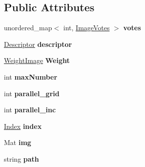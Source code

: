 \subsection*{\-Public \-Attributes}
\begin{DoxyCompactItemize}
\item 
\hypertarget{classMatchingImage_acffbf75099f1a39f35bb2296301828c8}{unordered\-\_\-map$<$ int, \hyperlink{classImageVotes}{\-Image\-Votes} $>$ {\bfseries votes}}\label{classMatchingImage_acffbf75099f1a39f35bb2296301828c8}

\item 
\hypertarget{classMatchingImage_a95e570f95473d1879d0bc67966dd5a6b}{\hyperlink{classDescriptor}{\-Descriptor} {\bfseries descriptor}}\label{classMatchingImage_a95e570f95473d1879d0bc67966dd5a6b}

\item 
\hypertarget{classMatchingImage_a2b29bfff30c24d43f3ffb674a1ee3911}{\hyperlink{classWeightImage}{\-Weight\-Image} {\bfseries \-Weight}}\label{classMatchingImage_a2b29bfff30c24d43f3ffb674a1ee3911}

\item 
\hypertarget{classMatchingImage_a3ea900f8b77ed661c806b2f66ecc7b3b}{int {\bfseries max\-Number}}\label{classMatchingImage_a3ea900f8b77ed661c806b2f66ecc7b3b}

\item 
\hypertarget{classMatchingImage_a4284d3d4a717cbf103c25b5433e81adc}{int {\bfseries parallel\-\_\-grid}}\label{classMatchingImage_a4284d3d4a717cbf103c25b5433e81adc}

\item 
\hypertarget{classMatchingImage_ad7aff8b60720a4f8aff420d7e18a3dc7}{int {\bfseries parallel\-\_\-inc}}\label{classMatchingImage_ad7aff8b60720a4f8aff420d7e18a3dc7}

\item 
\hypertarget{classMatchingImage_adbe968ad134d521a353558558973130d}{\hyperlink{classIndex}{\-Index} {\bfseries index}}\label{classMatchingImage_adbe968ad134d521a353558558973130d}

\item 
\hypertarget{classMatchingImage_adacc530b2a485ded2374c583412232c3}{\-Mat {\bfseries img}}\label{classMatchingImage_adacc530b2a485ded2374c583412232c3}

\item 
\hypertarget{classMatchingImage_a439633963d23178a69fb680b26c6f183}{string {\bfseries path}}\label{classMatchingImage_a439633963d23178a69fb680b26c6f183}


\end{DoxyCompactItemize}
